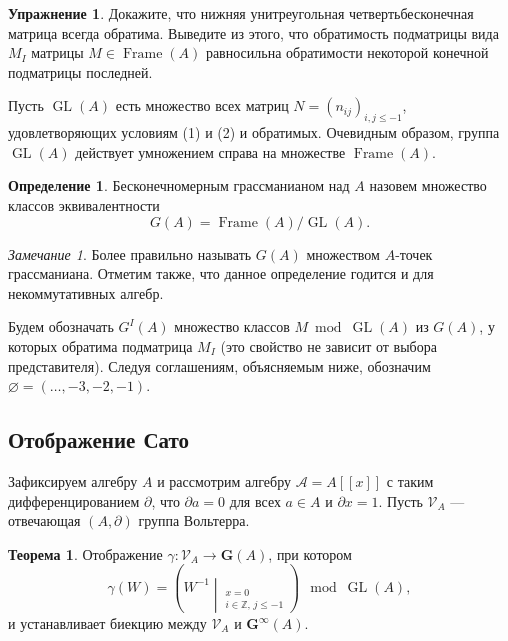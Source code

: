 \documentclass{article}
\theoremstyle{definition}
\newtheorem{theorem}{Теорема}[section]
\theoremstyle{definition} %
\newtheorem{definition}{Определение}[section]
\theoremstyle{remark}     %
\newtheorem*{remark}{Замечание}
\theoremstyle{definition}
\theoremstyle{definition}
\theoremstyle{definition}
\theoremstyle{definition}
\theoremstyle{definition}
\theoremstyle{definition}
\theoremstyle{definition}
\theoremstyle{definition}
\newtheorem{exercise}{Упражнение}[section]
\begin{document}
\begin{exercise}
  Докажите, что нижняя унитреугольная четвертьбесконечная матрица всегда обратима. Выведите из этого, что обратимость подматрицы вида \(M_I\) матрицы \(M \in \operatorname{Frame}(A)\) равносильна обратимости некоторой конечной подматрицы последней.
\end{exercise}

Пусть \(\operatorname{GL}(A)\) есть множество всех матриц \(N = (n_{ij})_{i,j \le -1}\), удовлетворяющих условиям (1) и (2) и обратимых. Очевидным образом, группа \(\operatorname{GL}(A)\) действует умножением справа на множестве \(\operatorname{Frame}(A)\).

\begin{definition}
  Бесконечномерным грассманианом над \(A\) назовем множество классов эквивалентности
  \[
    G(A) = \operatorname{Frame}(A) / \operatorname{GL}(A).
  \]
\end{definition}

\begin{remark}
  Более правильно называть \(G(A)\) множеством \(A\)-точек грассманиана. Отметим также, что данное определение годится и для некоммутативных алгебр.
\end{remark}

Будем обозначать \(G^I(A)\) множество классов \(M \bmod \operatorname{GL}(A)\) из \(G(A)\), у которых обратима подматрица \(M_I\) (это свойство не зависит от выбора представителя). Следуя соглашениям, объясняемым ниже, обозначим \(\varnothing = (\dots, -3, -2, -1)\).



\subsection{Отображение Сато}

Зафиксируем алгебру \( A \) и рассмотрим алгебру \( \mathcal{A} = A[[x]] \) с таким дифференцированием \( \partial \), что \( \partial a = 0 \) для всех \( a \in A \) и \( \partial x = 1 \). Пусть \( \mathcal{V}_A \) — отвечающая \( (A, \partial) \) группа Вольтерра.

\begin{theorem}
  Отображение \( \gamma: \mathcal{V}_A \to \mathbf{G}(A) \), при котором  
  \[
    \gamma(W) = \left( W^{-1} \middle|_{\substack{x=0 \\ i \in \mathbb{Z},\, j \leq -1}} \right) \mod \operatorname{GL}(A),
  \]
  и устанавливает биекцию между \( \mathcal{V}_A \) и \( \mathbf{G}^\infty(A) \).
\end{theorem}
\end{document}
